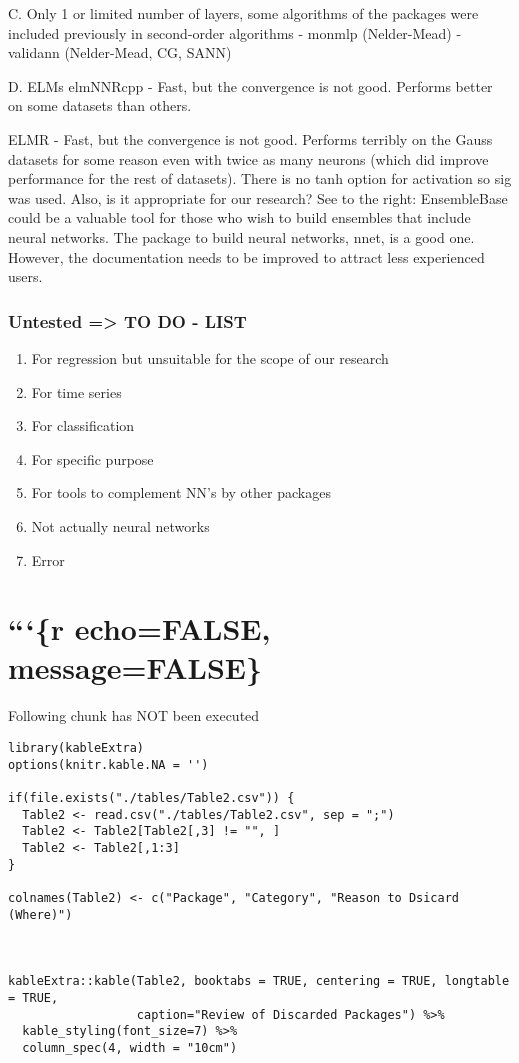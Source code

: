 C. Only 1 or limited number of layers, some algorithms of the packages
were included previously in second-order algorithms - monmlp
(Nelder-Mead) - validann (Nelder-Mead, CG, SANN)

D. ELMs elmNNRcpp - Fast, but the convergence is not good. Performs
better on some datasets than others.

ELMR - Fast, but the convergence is not good. Performs terribly on the
Gauss datasets for some reason even with twice as many neurons (which
did improve performance for the rest of datasets). There is no tanh
option for activation so sig was used. Also, is it appropriate for our
research? See to the right: EnsembleBase could be a valuable tool for
those who wish to build ensembles that include neural networks. The
package to build neural networks, nnet, is a good one. However, the
documentation needs to be improved to attract less experienced users.

\hypertarget{untested-to-do---list}{%
\subsubsection{Untested =\textgreater{} TO DO -
LIST}\label{untested-to-do---list}}

\begin{enumerate}
\def\labelenumi{\arabic{enumi}.}
\tightlist
\item
  For regression but unsuitable for the scope of our research
\item
  For time series
\item
  For classification
\item
  For specific purpose
\item
  For tools to complement NN's by other packages
\item
  Not actually neural networks
\item
  Error 
\end{enumerate}

\hypertarget{r-echofalse-messagefalse}{%
\section{```\{r echo=FALSE,
message=FALSE\}}\label{r-echofalse-messagefalse}}

Following chunk has NOT been executed

\begin{verbatim}
library(kableExtra)
options(knitr.kable.NA = '')

if(file.exists("./tables/Table2.csv")) {  
  Table2 <- read.csv("./tables/Table2.csv", sep = ";")
  Table2 <- Table2[Table2[,3] != "", ]
  Table2 <- Table2[,1:3]
}

colnames(Table2) <- c("Package", "Category", "Reason to Dsicard (Where)")



kableExtra::kable(Table2, booktabs = TRUE, centering = TRUE, longtable = TRUE,
                  caption="Review of Discarded Packages") %>%
  kable_styling(font_size=7) %>%
  column_spec(4, width = "10cm")
\end{verbatim}

